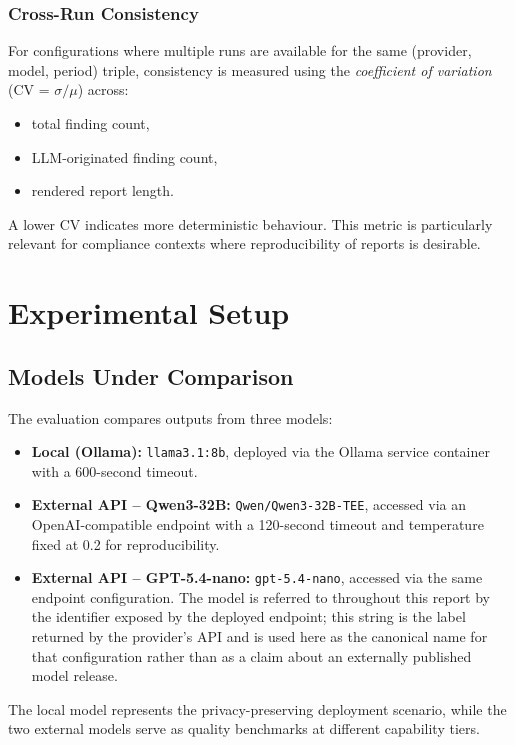 \documentclass[]{UCD_CS_FYP_Report}
\begin{document}
\subsubsection{Cross-Run Consistency}

For configurations where multiple runs are available for the same (provider, model, period) triple, consistency is measured using the \textit{coefficient of variation} (CV = $\sigma / \mu$) across:
\begin{itemize}
    \item total finding count,
    \item LLM-originated finding count,
    \item rendered report length.
\end{itemize}

A lower CV indicates more deterministic behaviour. This metric is particularly relevant for compliance contexts where reproducibility of reports is desirable.

\section{Experimental Setup}
\label{sec:experimental_setup}

\subsection{Models Under Comparison}

The evaluation compares outputs from three models:
\begin{itemize}
    \item \textbf{Local (Ollama):} \texttt{llama3.1:8b}, deployed via the Ollama service container with a 600-second timeout.
    \item \textbf{External API -- Qwen3-32B:} \texttt{Qwen/Qwen3-32B-TEE}, accessed via an OpenAI-compatible endpoint with a 120-second timeout and temperature fixed at 0.2 for reproducibility.
    \item \textbf{External API -- GPT-5.4-nano:} \texttt{gpt-5.4-nano}, accessed via the same endpoint configuration. The model is referred to throughout this report by the identifier exposed by the deployed endpoint; this string is the label returned by the provider's API and is used here as the canonical name for that configuration rather than as a claim about an externally published model release.
\end{itemize}

The local model represents the privacy-preserving deployment scenario, while the two external models serve as quality benchmarks at different capability tiers.
\end{document}
